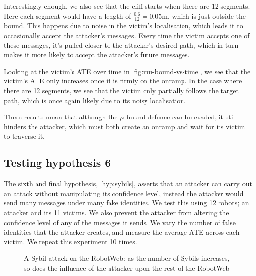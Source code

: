 Interestingly enough, we also see that the cliff starts when there are 12 segments. Here each segment would have a length of $\frac{0.6}{12} = 0.05$m, which is just outside the bound. This happens due to noise in the victim's localisation, which leads it to occasionally accept the attacker's messages. Every time the victim accepts one of these messages, it's pulled closer to the attacker's desired path, which in turn makes it more likely to accept the attacker's future messages.

Looking at the victim's ATE over time in \ref{fig:mu-bound-vs-time}, we see that the victim's ATE only increases once it is firmly on the onramp. In the case where there are 12 segments, we see that the victim only partially follows the target path, which is once again likely due to its noisy localisation. 

These results mean that although the $\mu$ bound defence can be evaded, it still hinders the attacker, which must both create an onramp and wait for its victim to traverse it.

\subsection{Testing hypothesis 6}
The sixth and final hypothesis, \ref{hyp:sybils}, asserts that an attacker can carry out an attack without manipulating its confidence level, instead the attacker would send many messages under many fake identities. We test this using 12 robots; an attacker and its 11 victims. We also prevent the attacker from altering the confidence level of any of the messages it sends. We vary the number of false identities that the attacker creates, and measure the average ATE across each victim. We repeat this experiment 10 times.

\begin{figure}[!ht]
	\centering
	\caption{A Sybil attack on the RobotWeb: as the number of Sybils increases, so does the influence of the attacker upon the rest of the RobotWeb}
\end{figure}


